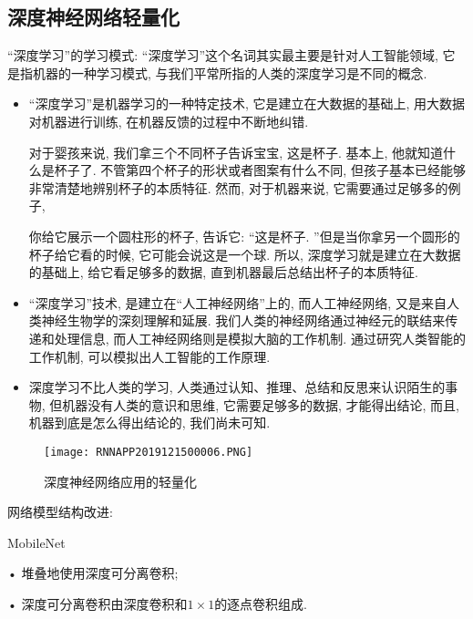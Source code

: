 \subsection{深度神经网络轻量化}
“深度学习”的学习模式: “深度学习”这个名词其实最主要是针对人工智能领域, 它是指机器的一种学习模式, 与我们平常所指的人类的深度学习是不同的概念.
\begin{itemize}
    \item “深度学习”是机器学习的一种特定技术, 它是建立在大数据的基础上, 用大数据对机器进行训练, 在机器反馈的过程中不断地纠错.
    \begin{example}
    对于婴孩来说, 我们拿三个不同杯子告诉宝宝, 这是杯子. 基本上, 他就知道什么是杯子了. 不管第四个杯子的形状或者图案有什么不同, 但孩子基本已经能够非常清楚地辨别杯子的本质特征.
    然而, 对于机器来说, 它需要通过足够多的例子,
    \end{example}
    \begin{example}
    你给它展示一个圆柱形的杯子, 告诉它: “这是杯子. ”但是当你拿另一个圆形的杯子给它看的时候, 它可能会说这是一个球. 所以, 深度学习就是建立在大数据的基础上, 给它看足够多的数据, 直到机器最后总结出杯子的本质特征.
    \end{example}
    \item “深度学习”技术, 是建立在“人工神经网络”上的, 而人工神经网络, 又是来自人类神经生物学的深刻理解和延展. 我们人类的神经网络通过神经元的联结来传递和处理信息, 而人工神经网络则是模拟大脑的工作机制.
    通过研究人类智能的工作机制, 可以模拟出人工智能的工作原理.

    \item 深度学习不比人类的学习, 人类通过认知、推理、总结和反思来认识陌生的事物, 但机器没有人类的意识和思维, 它需要足够多的数据, 才能得出结论, 而且, 机器到底是怎么得出结论的, 我们尚未可知.
\end{itemize}
\begin{figure}[H]
\centering
\texttt{[image: RNNAPP2019121500006.PNG]}
\caption{深度神经网络应用的轻量化}
\label{RNNAPP2019121500006}\vspace{-0.4cm}
\end{figure}

网络模型结构改进:

MobileNet

• 堆叠地使用深度可分离卷积;

• 深度可分离卷积由深度卷积和$1\times 1$的逐点卷积组成.

